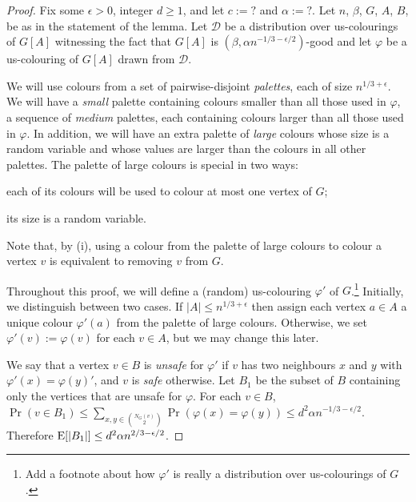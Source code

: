 \documentclass[kpfonts]{patmorin}
\newcommand{\defin}[1]{\emph{\color{brightmaroon}#1}}
\begin{document}
\begin{proof}
  Fix some $\epsilon >0$, integer $d\ge 1$, and let $c:=?$ and $\alpha:=?$. Let $n$, $\beta$, $G$, $A$, $B$, be as in the statement of the lemma.  Let $\mathcal{D}$ be a distribution over us-colourings of $G[A]$ witnessing the fact that $G[A]$ is $(\beta,\alpha n^{-1/3-\epsilon/2})$-good and let $\varphi$ be a us-colouring of $G[A]$ drawn from $\mathcal{D}$.

  We will use colours from a set of pairwise-disjoint \defin{palettes}, each of size $n^{1/3+\epsilon}$.  We will have a \defin{small} palette containing colours smaller than all those used in $\varphi$, a sequence of \defin{medium} palettes, each containing colours larger than all those used in $\varphi$.  In addition, we will have an extra palette of \defin{large} colours whose size is a random variable and whose values are larger than the colours in all other palettes. The palette of large colours is special in two ways:
  \begin{inparaenum}[(i)]
    \item each of its colours will be used to colour at most one vertex of $G$;
    \item its size is a random variable.
  \end{inparaenum}
  Note that, by (i), using a colour from the palette of large colours to colour a vertex $v$ is equivalent to removing $v$ from $G$.

 Throughout this proof, we will define a (random) us-colouring $\varphi'$ of $G$.\footnote{Add a footnote about how $\varphi'$ is really a distribution over us-colourings of $G$.}  Initially, we distinguish between two cases.
  If $|A|\le n^{1/3+\epsilon}$ then assign each vertex $a\in A$ a unique colour $\varphi'(a)$ from the palette of large colours.  Otherwise, we set $\varphi'(v):=\varphi(v)$ for each $v\in A$, but we may change this later.


  We say that a vertex $v\in B$ is \defin{unsafe} for $\varphi'$ if $v$ has two neighbours $x$ and $y$ with $\varphi'(x)=\varphi(y)'$, and $v$ is \defin{safe} otherwise.  Let $B_1$ be the subset of $B$ containing only the vertices that are unsafe for $\varphi$. For each $v\in B$, $\Pr(v\in B_1)\le \sum_{x,y\in \binom{N_G(v)}{2}}\Pr(\varphi(x)=\varphi(y))\le d^2 \alpha n^{-1/3-\epsilon/2}$.  Therefore $\mathrm{E}[|B_1|]\le d^2 \alpha n^{2/3-\epsilon/2}$.


\end{proof}
\end{document}
